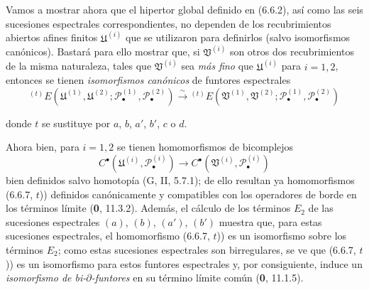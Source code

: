 \begin{env}[6.6.7]
\label{III.6.6.7}
Vamos a mostrar ahora que el hipertor global definido en (6.6.2), así como
las seis sucesiones espectrales correspondientes, no dependen de los
recubrimientos abiertos afines finitos $\mathfrak U^{(i)}$ que se utilizaron
para definirlos (salvo isomorfismos canónicos). Bastará para ello mostrar que,
si $\mathfrak V^{(i)}$ son otros dos recubrimientos de la misma naturaleza,
tales que $\mathfrak V^{(i)}$ sea \emph{más fino} que $\mathfrak U^{(i)}$
para $i=1,2$, entonces se tienen \emph{isomorfismos canónicos} de funtores espectrales
\[
  {}^{(t)}E
  (\mathfrak U^{(1)},\mathfrak U^{(2)};
   \mathscr P_\bullet^{(1)},\mathscr P_\bullet^{(2)})
  \xrightarrow{\sim}
  {}^{(t)}E
  (\mathfrak V^{(1)},\mathfrak V^{(2)};
   \mathscr P_\bullet^{(1)},\mathscr P_\bullet^{(2)})
  \tag{6.6.7, $t$)}\label{III.6.6.7.t.fr}
\]

donde $t$ se sustituye por $a$, $b$, $a'$, $b'$, $c$ o $d$.

Ahora bien, para $i=1,2$ se tienen homomorfismos de bicomplejos
\[
  C^\bullet(\mathfrak U^{(i)},\mathscr P_\bullet^{(i)})
  \longrightarrow
  C^\bullet(\mathfrak V^{(i)},\mathscr P_\bullet^{(i)})
\]
bien definidos salvo homotopía (G, II, 5.7.1); de ello resultan ya
homomorfismos (6.6.7, $t$)) definidos canónicamente y compatibles con los
operadores de borde en los términos límite (\textbf{0}, 11.3.2). Además,
el cálculo de los términos $E_2$ de las sucesiones espectrales $(a)$, $(b)$,
$(a')$, $(b')$ muestra que, para estas sucesiones espectrales, el homomorfismo
(6.6.7, $t$)) es un isomorfismo sobre los términos $E_2$; como estas sucesiones
espectrales son birregulares, se ve que (6.6.7, $t$)) es un isomorfismo para
estos funtores espectrales y, por consiguiente, induce un \emph{isomorfismo de
bi-$\partial$-funtores} en su término límite común
(\textbf{0}, 11.1.5).


\end{env}
